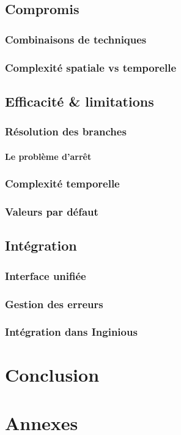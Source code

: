 \documentclass[a4paper]{report}
\begin{document}



\section{Compromis}


\subsection{Combinaisons de techniques}

\subsection{Complexité spatiale vs temporelle}

\section{Efficacité \& limitations}

\subsection{Résolution des branches}

\subsubsection{Le problème d'arrêt}

\subsection{Complexité temporelle}

\subsection{Valeurs par défaut}

\section{Intégration}

\subsection{Interface unifiée}

\subsection{Gestion des erreurs}

\subsection{Intégration dans Inginious}



\chapter{Conclusion}


 

\chapter{Annexes}
\end{document}
